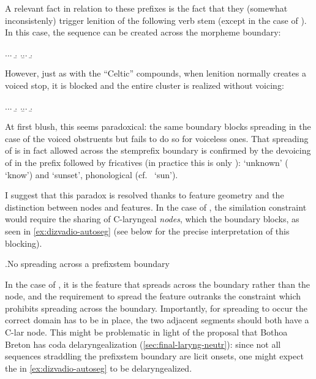 A relevant fact in relation to these prefixes is the fact that they (somewhat inconsistenly) trigger lenition of the following verb stem (except in the case of \ipa{[m]}). In this case, the sequence \ipa{[zv]} can be created across the morpheme boundary:

\ex.\a.\a.
\b.
\z.\b.\a.
\b.


However, just as with the \enquote{Celtic} compounds, when lenition normally creates a voiced stop, it is blocked and the entire cluster is realized without voicing:

\ex.\a.\a.
\b.
\z.\b.\a.
\b.


At first blush, this seems paradoxical: the same boundary blocks spreading in the case of the voiced obstruents but fails to do so for voiceless ones. That spreading of  is in fact allowed across the stem\endash prefix boundary is confirmed by the devoicing of \ipa{[z]} in the prefix  followed by  fricatives (in practice this is only \ipa{[h]}):  `unknown' (\ipa{[hãˈnaːo]} `know') and  `sunset', phonological \ipa{[ˌdisˈhjɒːl]} (cf.\ \ipa{[hjɒːl]} `sun').

I suggest that this paradox is resolved thanks to feature geometry and the distinction between nodes and features. In the case of \ipa{[ˌdizˈvaːdio]}, the similation constraint would require the sharing of C-laryngeal \emph{nodes}, which the boundary blocks, as seen in \ref{ex:dizvadio-autoseg} (see below for the precise interpretation of this blocking).

\ex.\label{ex:dizvadio-autoseg}No spreading across a prefix\endash stem boundary\\


In the case of , it is the feature that spreads across the boundary rather than the node, and the requirement to spread the feature outranks the constraint which prohibits spreading across the boundary. Importantly, for spreading to occur the correct domain has to be in place, \ie the two adjacent segments should both have a C-lar node. This might be problematic in light of the proposal that Bothoa Breton has coda delaryngealization (\cref{sec:final-laryng-neutr}): since not all sequences straddling the prefix\endash stem boundary are licit onsets, one might expect the \ipa{[z]} in \ref{ex:dizvadio-autoseg} to be delaryngealized.

